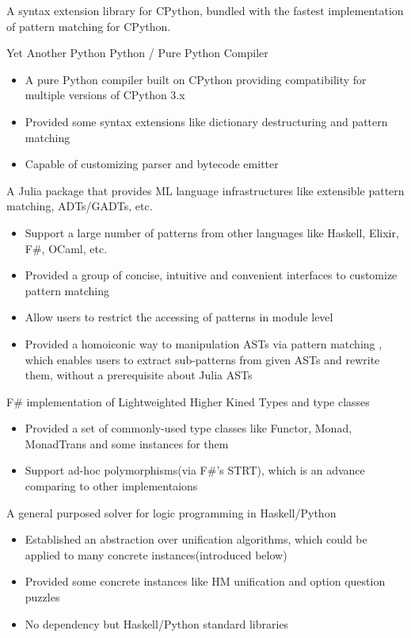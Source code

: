 \documentclass{resume}
\begin{document}
A syntax extension library for CPython, bundled with the fastest implementation of pattern matching for CPython.

Yet Another Python Python / Pure Python Compiler
\begin{itemize}
  \item A pure Python compiler built on CPython providing compatibility for multiple versions of CPython 3.x
  \item Provided some syntax extensions like dictionary destructuring and pattern matching
  \item Capable of customizing parser and bytecode emitter
\end{itemize}

A Julia package that provides ML language infrastructures like extensible pattern matching, ADTs/GADTs, etc.
\begin{itemize}
  \item Support a large number of patterns from other languages like Haskell, Elixir, F\#, OCaml, etc.
  \item Provided a group of concise, intuitive and convenient interfaces to customize pattern matching
  \item Allow users to restrict the accessing of patterns in module level
  \item Provided a homoiconic way to manipulation ASTs via pattern matching
        , which enables users to extract sub-patterns from given ASTs and rewrite them, without a prerequisite
  about Julia ASTs
\end{itemize}

F\# implementation of Lightweighted Higher Kined Types and type classes
\begin{itemize}
 \item Provided a set of commonly-used type classes like Functor, Monad, MonadTrans and some instances for them
 \item Support ad-hoc polymorphisms(via F\#'s STRT), which is an advance comparing to other implementaions
\end{itemize}

A general purposed solver for logic programming in Haskell/Python
\begin{itemize}
 \item Established an abstraction over unification algorithms, which could be applied to many concrete instances(introduced below)
 \item Provided some concrete instances like HM unification and option question puzzles
 \item No dependency but Haskell/Python standard libraries
\end{itemize}
\end{document}
